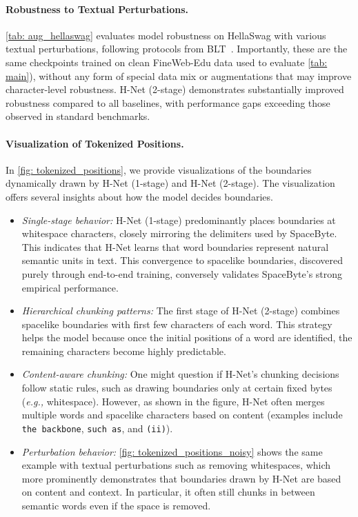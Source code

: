 \documentclass{article}
\newcommand{\citep}{\parencite}
\newcommand{\model}{H-Net}
\newcommand{\twostage}{2-stage}
\newcommand{\eg}{\emph{e.g.,}}
\theoremstyle{plain}
\theoremstyle{remark}
\begin{document}
\paragraph{Robustness to Textual Perturbations.}
\cref{tab: aug_hellaswag} evaluates model robustness on HellaSwag with various textual perturbations, following protocols from BLT~\citep{BLT}.
Importantly, these are the same checkpoints trained on clean FineWeb-Edu data used to evaluate \cref{tab: main}),
without any form of special data mix or augmentations that may improve character-level robustness.
\model{} (\twostage{}) demonstrates substantially improved robustness compared to all baselines, with performance gaps exceeding those observed in standard benchmarks.

\paragraph{Visualization of Tokenized Positions.}
\label{sec: analysis}
In \cref{fig: tokenized_positions}, we provide visualizations of the boundaries dynamically drawn by H-Net (1-stage) and H-Net (2-stage).
The visualization offers several insights about how the model decides boundaries.
\begin{itemize}
    \item \textit{Single-stage behavior:} H-Net (1-stage) predominantly places boundaries at whitespace characters, closely mirroring the delimiters used by SpaceByte.
    This indicates that H-Net learns that word boundaries represent natural semantic units in text.
    This convergence to spacelike boundaries, discovered purely through end-to-end training, conversely validates SpaceByte's strong empirical performance.
    \item \textit{Hierarchical chunking patterns:} The first stage of H-Net (2-stage) combines spacelike boundaries with first few characters of each word.
    This strategy helps the model because once the initial positions of a word are identified, the remaining characters become highly predictable.
    \item \textit{Content-aware chunking:}
    One might question if H-Net's chunking decisions follow static rules, such as drawing boundaries only at certain fixed bytes (\eg{} whitespace).
    However, as shown in the figure, H-Net often merges multiple words and spacelike characters based on content (examples include \texttt{the backbone}, \texttt{such as}, and \texttt{(ii)}).
    \item \textit{Perturbation behavior:} 
    \cref{fig: tokenized_positions_noisy} shows the same example with textual perturbations such as removing whitespaces, which more prominently demonstrates that boundaries drawn by H-Net are based on content and context. In particular, it often still chunks in between semantic words even if the space is removed.
\end{itemize}
\end{document}
